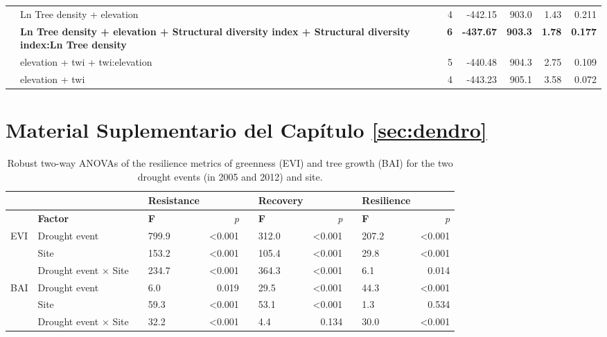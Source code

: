 \begin{table}
\begin{adjustbox}{width=\linewidth}
\begin{threeparttable}
\begin{tabular}{@{}l|lrrrrr@{}}
 & Ln Tree density + elevation & 4 & -442.15 & 903.0 & 1.43 & 0.211 \\
 & \textbf{Ln Tree  density + elevation + Structural diversity index + Structural diversity index:Ln Tree density} & \textbf{6} & \textbf{-437.67} & \textbf{903.3} & \textbf{1.78} & \textbf{0.177} \\
 & elevation +  twi + twi:elevation & 5 & -440.48 & 904.3 & 2.75 & 0.109 \\
 & elevation +  twi & 4 & -443.23 & 905.1 & 3.58 & 0.072
\end{tabular}
\end{threeparttable}
\end{adjustbox}
\end{table}


\chapter{\textcolor{ctcolormain}{Material Suplementario del Capítulo \ref{sec:dendro}}}\label{sec:appendix:dendro}

\begin{table}[ht]
\caption{Robust two-way ANOVAs of the resilience metrics of greenness (EVI) and tree growth (BAI) for the two drought events (in 2005 and 2012) and site.}
\label{tab:dendro:robustanova}
\begingroup\fontsize{8}{10}\selectfont
\begin{tabular}{@{}llllrllrllr@{}}
\toprule
 &  &  & \textbf{Resistance} &  &  & \textbf{Recovery} &  &  & \textbf{Resilience} &  \\ \midrule
 & \textbf{Factor} &  & \textbf{F} & \textit{p} &  & \textbf{F} & \textit{p} &  & \textbf{F} & \textit{p} \\ \cmidrule(lr){4-5} \cmidrule(lr){7-8} \cmidrule(l){10-11} 
\multirow{3}{*}{EVI} & Drought event &  & 799.9 & \textless 0.001 &  & 312.0 & \textless 0.001 &  & 207.2 & \textless 0.001 \\
 & Site &  & 153.2 & \textless 0.001 &  & 105.4 & \textless 0.001 &  & 29.8 & \textless 0.001 \\
 & Drought event $\times$ Site &  & 234.7 & \textless 0.001 &  & 364.3 & \textless 0.001 &  & 6.1 & 0.014 \\ \midrule
\multirow{3}{*}{BAI} & Drought event &  & 6.0 & 0.019 &  & 29.5 & \textless 0.001 &  & 44.3 & \textless 0.001 \\
 & Site &  & 59.3 & \textless 0.001 &  & 53.1 & \textless 0.001 &  & 1.3 & 0.534 \\
 & Drought event $\times$ Site &  & 32.2 & \textless 0.001 &  & 4.4 & 0.134 &  & 30.0 & \textless 0.001 \\ \bottomrule
\end{tabular}
\endgroup{}
\end{table}

